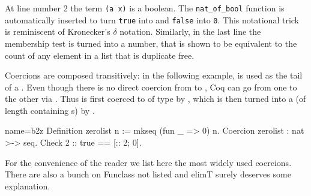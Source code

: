 At line number 2 the term \lstinline/(a x)/ is a boolean.  The
\lstinline/nat_of_bool/ function is automatically inserted to turn
\lstinline/true/ into  and \lstinline/false/ into \lstinline/0/.
This notational trick is reminiscent of Kronecker's $\delta$ notation.
Similarly, in the last line the membership test is turned into
a number, that is shown to be equivalent to the count of any
element in a list that is duplicate free.

%
%

Coercions are composed transitively: in the following example, 
is used as the tail of a . Even though there is no direct coercion
from  to , Coq can go from one to the other via .
Thus  is first coerced to  of type  by ,
which is then turned into a  (of length  containing s) by
.

\begin{coq}{name=b2z}{}
Definition zerolist n := mkseq (fun _ => 0) n.
Coercion zerolist : nat >-> seq.
Check 2 :: true == [:: 2; 0].
\end{coq}

For the convenience of the reader we list here the most widely
used coercions. There are also a bunch on Funclass not listed
and elimT surely deserves some explanation.

